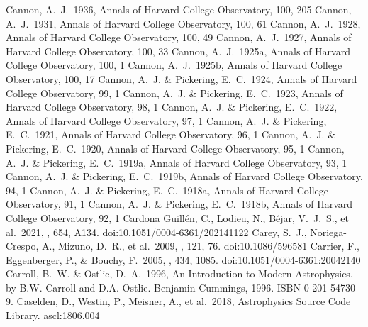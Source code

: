 \documentclass[twocolumn,tighten,twocolappendix]{aastex631}
\begin{document}
\begin{thebibliography}{}
 Cannon, A.~J.\ 1936, Annals of Harvard College Observatory, 100, 205
 Cannon, A.~J.\ 1931, Annals of Harvard College Observatory, 100, 61
 Cannon, A.~J.\ 1928, Annals of Harvard College Observatory, 100, 49
 Cannon, A.~J.\ 1927, Annals of Harvard College Observatory, 100, 33
 Cannon, A.~J.\ 1925a, Annals of Harvard College Observatory, 100, 1
 Cannon, A.~J.\ 1925b, Annals of Harvard College Observatory, 100, 17
 Cannon, A.~J. \& Pickering, E.~C.\ 1924, Annals of Harvard College Observatory, 99, 1
 Cannon, A.~J. \& Pickering, E.~C.\ 1923, Annals of Harvard College Observatory, 98, 1
 Cannon, A.~J. \& Pickering, E.~C.\ 1922, Annals of Harvard College Observatory, 97, 1
 Cannon, A.~J. \& Pickering, E.~C.\ 1921, Annals of Harvard College Observatory, 96, 1
 Cannon, A.~J. \& Pickering, E.~C.\ 1920, Annals of Harvard College Observatory, 95, 1
 Cannon, A.~J. \& Pickering, E.~C.\ 1919a, Annals of Harvard College Observatory, 93, 1
 Cannon, A.~J. \& Pickering, E.~C.\ 1919b, Annals of Harvard College Observatory, 94, 1
 Cannon, A.~J. \& Pickering, E.~C.\ 1918a, Annals of Harvard College Observatory, 91, 1
 Cannon, A.~J. \& Pickering, E.~C.\ 1918b, Annals of Harvard College Observatory, 92, 1
 Cardona Guill{\'e}n, C., Lodieu, N., B{\'e}jar, V.~J.~S., et al.\ 2021, \aap, 654, A134. doi:10.1051/0004-6361/202141122
 Carey, S.~J., Noriega-Crespo, A., Mizuno, D.~R., et al.\ 2009, \pasp, 121, 76. doi:10.1086/596581
 Carrier, F., Eggenberger, P., \& Bouchy, F.\ 2005, \aap, 434, 1085. doi:10.1051/0004-6361:20042140
 Carroll, B.~W. \& Ostlie, D.~A.\ 1996, An Introduction to Modern Astrophysics, by B.W. Carroll and D.A. Ostlie. Benjamin Cummings, 1996. ISBN 0-201-54730-9.
 Caselden, D., Westin, P., Meisner, A., et al.\ 2018, Astrophysics Source Code Library. ascl:1806.004

\end{thebibliography}
\end{document}
